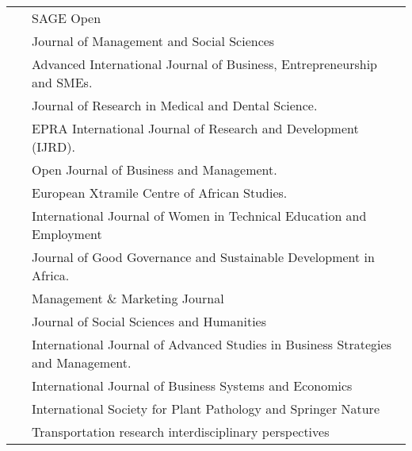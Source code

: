 \documentclass[a4paper, 12pt]{article}
\begin{document}
\begin{table}[H]
{\begin{tabular}{@{}ll@{}}
                ~\cite{nwokocha2021covid}             & SAGE Open                                                                        \\
                ~\cite{popoola2021work}               & Journal of Management and Social Sciences                                        \\
                ~\cite{bularafa2021effect}            & Advanced International Journal of Business, Entrepreneurship and SMEs.           \\
                ~\cite{dane2021effect}                & Journal of Research in Medical and Dental Science.                               \\
                ~\cite{ekpounobi2022informal}         & EPRA International Journal of Research and Development   (IJRD).                    \\
                ~\cite{enesi2021effect}               & Open Journal of Business and Management.                                         \\
                ~\cite{farayibi2020economic}          & European Xtramile Centre of African Studies.                                     \\
                ~\cite{kadir2021determinants}         & International Journal of Women in Technical Education and Employment             \\
                ~\cite{okoh2022assessment}            & Journal of Good Governance and Sustainable Development in Africa.                \\
                ~\cite{olubiyi2022measuring}          & Management \&   Marketing Journal                                                   \\
                ~\cite{okoh2022assessment}            & Journal of Social Sciences and Humanities                                        \\
                ~\cite{aburinfrastructure}            & International Journal of Advanced Studies in Business Strategies and Management. \\
                ~\cite{ohanyereeffects}               & International Journal of Business Systems and Economics                          \\
                ~\cite{balan2021true}                 & International Society for Plant Pathology and Springer Nature                    \\
                ~\cite{mogaji2020impact}              & Transportation research interdisciplinary perspectives                           \\ \bottomrule
            \end{tabular}%
        }
    \end{table}
\end{document}
